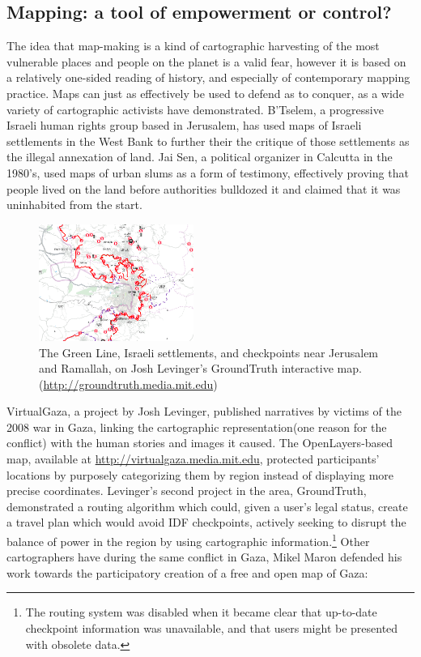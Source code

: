 \documentclass[11pt,oneside,notitlepage]{report}
\begin{document}
\subsection{Mapping: a tool of empowerment or control?}

The idea that map-making is a kind of cartographic harvesting of the most vulnerable places and people on the planet is a valid fear, however it is based on a relatively one-sided reading of history, and especially of contemporary mapping practice. Maps can just as effectively be used to defend as to conquer, as a wide variety of cartographic activists have demonstrated. B'Tselem, a progressive Israeli human rights group based in Jerusalem, has used maps of Israeli settlements in the West Bank to further their the critique of those settlements as the illegal annexation of land. Jai Sen, a political organizer in Calcutta in the 1980's, used maps of urban slums as a form of testimony, effectively proving that people lived on the land before authorities bulldozed it and claimed that it was uninhabited from the start. 

\begin{figure}
	\begin{flushright}
		\includegraphics[width=0.45\textwidth]{images/levinger-groundtruth.png}
		\caption{The Green Line, Israeli settlements, and checkpoints near Jerusalem and Ramallah, on Josh Levinger's GroundTruth interactive map. (\url{http://groundtruth.media.mit.edu})}
	\end{flushright}
\end{figure}

VirtualGaza, a project by Josh Levinger, published narratives by victims of the 2008 war in Gaza, linking the cartographic representation(one reason for the conflict) with the human stories and images it caused. The OpenLayers-based map, available at \url{http://virtualgaza.media.mit.edu}, protected participants' locations by purposely categorizing them by region instead of displaying more precise coordinates. Levinger's second project in the area, GroundTruth, demonstrated a routing algorithm which could, given a user's legal status, create a travel plan which would avoid IDF checkpoints, actively seeking to disrupt the balance of power in the region by using cartographic information.\footnote{The routing system was disabled when it became clear that up-to-date checkpoint information was unavailable, and that users might be presented with obsolete data.} Other cartographers have during the same conflict in Gaza, Mikel Maron defended his work towards the participatory creation of a free and open map of Gaza:  
\end{document}
